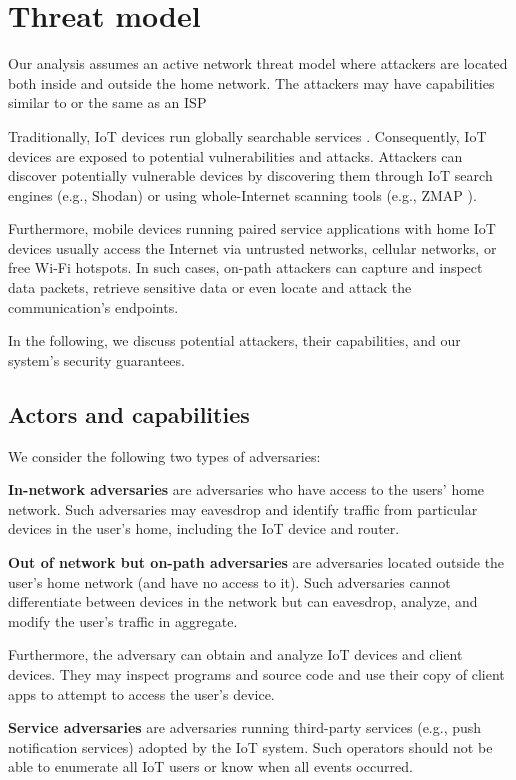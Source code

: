 \section{Threat model}

Our analysis assumes an active network threat model where attackers are located both inside and outside the home network. The attackers may have capabilities similar to or the same as an ISP

Traditionally, IoT devices run globally searchable services \cite{antonakakis2017understanding}. Consequently, IoT devices are exposed to potential vulnerabilities and attacks. Attackers can discover potentially vulnerable devices by discovering them through IoT search engines (e.g., Shodan) or using whole-Internet scanning tools (e.g., ZMAP \cite{wiemer2001software}).

Furthermore, mobile devices running paired service applications with home IoT devices usually access the Internet via untrusted networks, cellular networks, or free Wi-Fi hotspots. In such cases, on-path attackers can capture and inspect data packets, retrieve sensitive data or even locate and attack the communication's endpoints. 

In the following, we discuss potential attackers, their capabilities, and our system's security guarantees.

\subsection{Actors and capabilities}
We consider the following two types of adversaries:

\textbf{In-network adversaries} are adversaries who have access to the users' home network. Such adversaries may eavesdrop and identify traffic from particular devices in the user's home, including the IoT device and router.


\textbf{Out of network but on-path adversaries} are adversaries located outside the user's home network (and have no access to it). Such adversaries cannot differentiate between devices in the network but can eavesdrop, analyze, and modify the user’s traffic in aggregate. 

Furthermore, the adversary can obtain and analyze IoT devices and client devices. They may inspect programs and source code and use their copy of client apps to attempt to access the user's device.

\textbf{Service adversaries} are adversaries running third-party services (e.g., push notification services) adopted by the IoT system. Such operators should not be able to enumerate all IoT users or know when all events occurred.

